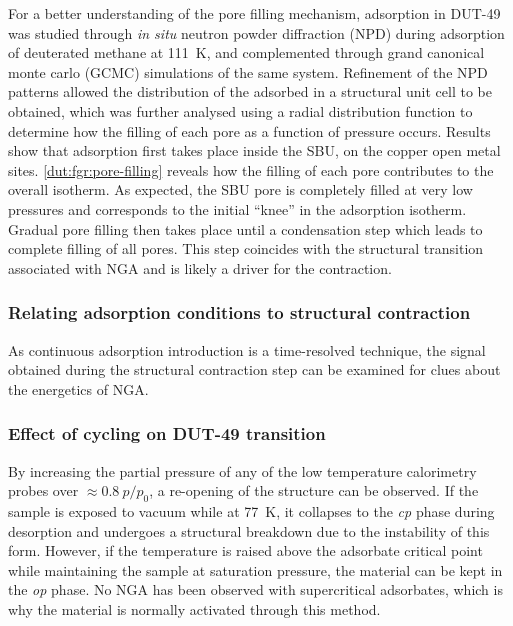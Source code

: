 For a better understanding of the pore filling mechanism, adsorption
in DUT-49 was studied through \textit{in situ} neutron powder diffraction
(NPD) during adsorption of deuterated methane  at \SI{111}{\kelvin},
and complemented through grand canonical monte carlo (GCMC) simulations
of the same system. Refinement of the NPD patterns allowed the distribution
of the adsorbed  in a structural unit cell to be obtained, which
was further analysed using a radial distribution function to determine
how the filling of each pore as a function of pressure occurs. 
Results show that adsorption first takes place inside the SBU,
on the copper open metal sites. 
\autoref{dut:fgr:pore-filling} reveals how
the filling of each pore contributes to the overall isotherm.
As expected, the SBU pore is completely filled at very low pressures
and corresponds to the initial ``knee'' in the adsorption isotherm. Gradual
pore filling then takes place until a condensation step which 
leads to complete filling of all pores. This step coincides with 
the structural transition associated with NGA and is likely a driver 
for the contraction.

\subsubsection{Relating adsorption conditions to structural contraction}

As continuous adsorption introduction is a time-resolved technique, 
the signal obtained during the structural contraction step can 
be examined for clues about the energetics of NGA. 



\subsubsection{Effect of cycling on DUT-49 transition}

By increasing the partial pressure of any of the low temperature 
calorimetry probes over \(\approx 0.8~p/p_0\), a re-opening
of the structure can be observed. If the sample is exposed to 
vacuum while at \SI{77}{\kelvin}, it collapses to the \textit{cp}
phase during desorption and undergoes a structural breakdown 
due to the instability of this form. However, if the temperature 
is raised above the adsorbate critical point while maintaining the
sample at saturation pressure, the material can be kept in the 
\textit{op} phase. No NGA has been observed with supercritical 
adsorbates, which is why the material is normally activated through
this method. 


